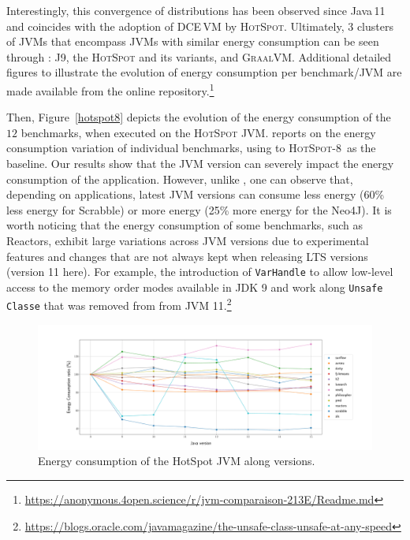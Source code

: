 Interestingly, this convergence of distributions has been observed since Java\,11 and coincides with the adoption of DCE\,VM by \textsc{HotSpot}.
Ultimately, 3 clusters of JVMs that encompass JVMs with similar energy consumption can be seen through : \textsc{J9}, the \textsc{HotSpot} and its variants, and \textsc{GraalVM}.
Additional detailed figures to illustrate the evolution of energy consumption per benchmark/JVM are made available from the online repository.\footnote{\url{https://anonymous.4open.science/r/jvm-comparaison-213E/Readme.md}}

Then, Figure~\ref{hotspot8} depicts the evolution of the energy consumption of the $12$ benchmarks, when executed on the \textsc{HotSpot} JVM.
 reports on the energy consumption variation of individual benchmarks, using to \textsc{HotSpot-8}\ as the baseline.
Our results show that the JVM version can severely impact the energy consumption of the application.
However, unlike , one can observe that, depending on applications, latest JVM versions can consume less energy (60\% less energy for \textsf{Scrabble}) or more energy (25\% more energy for the \textsf{Neo4J}).
It is worth noticing that the energy consumption of some benchmarks, such as \textsf{Reactors}, exhibit large variations across JVM versions due to experimental features and changes that are not always kept when releasing LTS versions (version 11 here).
For example, the introduction of \texttt{VarHandle} to allow low-level access to the memory order modes available in JDK 9 and work along \texttt{Unsafe Classe} that was removed from from JVM 11.\footnote{\url{https://blogs.oracle.com/javamagazine/the-unsafe-class-unsafe-at-any-speed}}

\begin{figure}%
    \centering
    \includegraphics[width=\linewidth]{imgs/lineplothotspot_chetemi8_baseon8}
    \caption{Energy consumption of the HotSpot JVM along versions.}
    \label{fig:hotspot8}
\end{figure}

